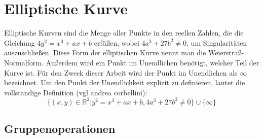 \section{Elliptische Kurve}
Elliptische Kurven sind die Menge aller Punkte in den reellen Zahlen, die die Gleichung $ 4y^2 = x^3 + ax + b $ erfüllen, wobei
$ 4a^3 + 27b^2 \neq 0 $, um Singularitäten auszuschließen. Diese Form der elliptischen Kurve nennt man die Weierstraß-Normalform.
Außerdem wird ein Punkt im Unendlichen benötigt, welcher Teil der Kurve ist. Für den Zweck dieser Arbeit wird der Punkt im 
Unendlichen als $\infty$ bezeichnet. Um den Punkt der Unendlichkeit explizit zu definieren, lautet die vollständige Definition (vgl andrea
corbellini): \[ \{ (x,y) \in \mathbb{R}^2 | y^2 = x^3 + ax + b, 4a^3 + 27b^2 \neq 0 \} \cup \{ \infty \} \]

\subsection{Gruppenoperationen}